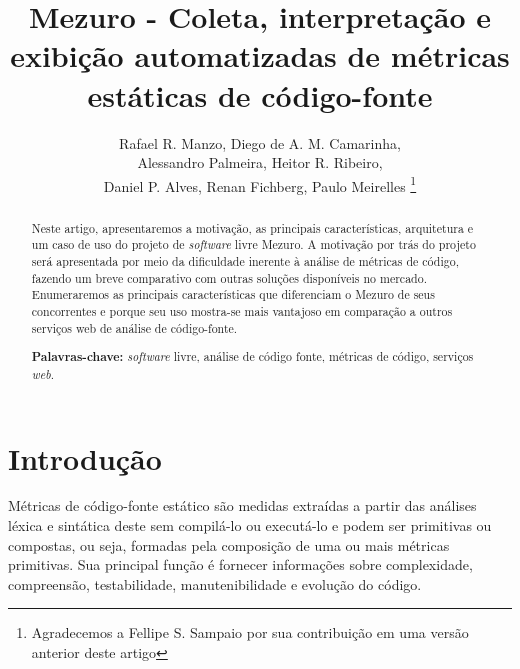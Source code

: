\documentclass{llncs}
\begin{document}
\sloppy
\title{Mezuro - Coleta, interpretação e exibição automatizadas de métricas estáticas de código-fonte}

\author{Rafael R. Manzo, Diego de A. M. Camarinha,\\
        Alessandro Palmeira, Heitor R. Ribeiro,\\
        Daniel P. Alves, Renan Fichberg, Paulo Meirelles
        \thanks{Agradecemos a Fellipe S. Sampaio por sua contribuição em uma versão anterior deste artigo}}


\maketitle
\begin{abstract}
  Neste artigo, apresentaremos a motivação, as principais características, arquitetura e um caso de uso do projeto de \textit{software} livre Mezuro. A motivação por trás do projeto será apresentada por meio da dificuldade inerente à análise de métricas de código, fazendo um breve comparativo com outras soluções disponíveis no mercado. Enumeraremos as principais características que diferenciam o Mezuro de seus concorrentes e porque seu uso mostra-se mais vantajoso em comparação a outros serviços web de análise de código-fonte.

\textbf{Palavras-chave:} \textit{software} livre, análise de código fonte, métricas de código, serviços \textit{web}.
\end{abstract}


\section{Introdução} \label{sec:intro}
Métricas de código-fonte estático são medidas extraídas a partir das análises léxica e sintática deste sem compilá-lo ou executá-lo e podem ser primitivas ou compostas, ou seja, formadas pela composição de uma ou mais métricas primitivas. Sua principal função é fornecer informações sobre complexidade, compreensão, testabilidade, manutenibilidade e evolução do código\cite{m13}.
\end{document}
